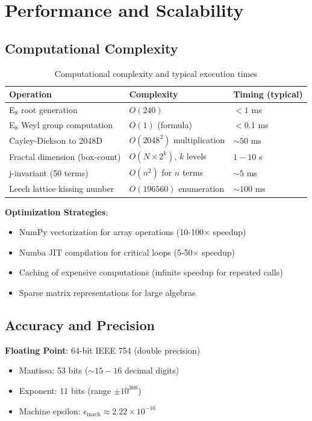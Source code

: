\section{Performance and Scalability}

\subsection{Computational Complexity}

\begin{table}[H]
\centering
\begin{tabular}{lll}
\toprule
\textbf{Operation} & \textbf{Complexity} & \textbf{Timing (typical)} \\
\midrule
E$_8$ root generation & $O(240)$ & $< 1$ ms \\
E$_8$ Weyl group computation & $O(1)$ (formula) & $< 0.1$ ms \\
Cayley-Dickson to 2048D & $O(2048^2)$ multiplication & $\sim 50$ ms \\
Fractal dimension (box-count) & $O(N \times 2^k)$, $k$ levels & $1-10$ s \\
j-invariant (50 terms) & $O(n^2)$ for $n$ terms & $\sim 5$ ms \\
Leech lattice kissing number & $O(196560)$ enumeration & $\sim 100$ ms \\
\bottomrule
\end{tabular}
\caption{Computational complexity and typical execution times}
\end{table}

\textbf{Optimization Strategies}:
\begin{itemize}
    \item NumPy vectorization for array operations (10-100$\times$ speedup)
    \item Numba JIT compilation for critical loops (5-50$\times$ speedup)
    \item Caching of expensive computations (infinite speedup for repeated calls)
    \item Sparse matrix representations for large algebras
\end{itemize}

\subsection{Accuracy and Precision}

\textbf{Floating Point}: 64-bit IEEE 754 (double precision)
\begin{itemize}
    \item Mantissa: 53 bits ($\sim 15-16$ decimal digits)
    \item Exponent: 11 bits (range $\pm 10^{308}$)
    \item Machine epsilon: $\epsilon_{\text{mach}} \approx 2.22 \times 10^{-16}$
\end{itemize}

